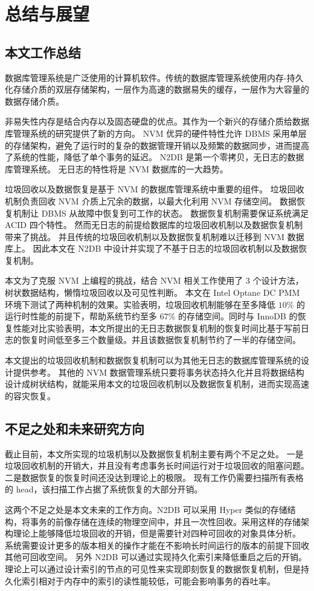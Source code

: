 
\chapter{总结与展望}

\section{本文工作总结}


数据库管理系统是广泛使用的计算机软件。传统的数据库管理系统使用内存-持久化存储介质的双层存储架构，一层作为高速的数据易失的缓存，一层作为大容量的数据存储介质。

非易失性内存是结合内存以及固态硬盘的优点。其作为一个新兴的存储介质给数据库管理系统的研究提供了新的方向。
NVM 优异的硬件特性允许 DBMS 采用单层的存储架构，避免了运行时的复杂的数据管理开销以及频繁的数据同步，进而提高了系统的性能，降低了单个事务的延迟。
N2DB 是第一个零拷贝，无日志的数据库管理系统。
无日志的特性将是 NVM 数据库的一大趋势。

垃圾回收以及数据恢复是基于 NVM 的数据库管理系统中重要的组件。
垃圾回收机制负责回收 NVM 介质上冗余的数据，以最大化利用 NVM 存储空间。
数据恢复机制让 DBMS 从故障中恢复到可工作的状态。
数据恢复机制需要保证系统满足 ACID 四个特性。
然而无日志的前提给数据库的垃圾回收机制以及数据恢复机制带来了挑战。
并且传统的垃圾回收机制以及数据恢复机制难以迁移到 NVM 数据库上。
因此本文在 N2DB 中设计并实现了不基于日志的垃圾回收机制以及数据恢复机制。

本文为了克服 NVM 上编程的挑战，结合 NVM 相关工作使用了 3 个设计方法，树状数据结构，懒惰垃圾回收以及可见性判断。
本文在 Intel Optane DC PMM 环境下测试了两种机制的效果。实验表明，垃圾回收机制能够在至多降低 $10\%$ 的运行时性能的前提下，帮助系统节约至多 $67\%$ 的存储空间。同时与 InnoDB 的恢复性能对比实验表明，本文所提出的无日志数据恢复机制的恢复时间比基于写前日志的恢复时间低至多三个数量级。并且该数据恢复机制节约了一半的存储空间。

本文提出的垃圾回收机制和数据恢复机制可以为其他无日志的数据库管理系统的设计提供参考。
其他的 NVM 数据管理系统只要将事务状态持久化并且将数据结构设计成树状结构，就能采用本文的垃圾回收机制以及数据恢复机制，进而实现高速的容灾恢复。


\section{不足之处和未来研究方向}

截止目前，本文所实现的垃圾机制以及数据恢复机制主要有两个不足之处。
一是垃圾回收机制的开销大，并且没有考虑事务长时间运行对于垃圾回收的阻塞问题。
二是数据恢复的恢复时间还没达到理论上的极限。
现有工作仍需要扫描所有表格的 head，该扫描工作占据了系统恢复的大部分开销。

这两个不足之处是本文未来的工作方向。N2DB 可以采用 Hyper 类似的存储结构，将事务的前像存储在连续的物理空间中，并且一次性回收。采用这样的存储架构理论上能够降低垃圾回收的开销，但是需要针对四种可回收的对象具体分析。
系统需要设计更多的版本相关的操作才能在不影响长时间运行的版本的前提下回收其他可回收空间。
另外 N2DB 可以通过实现持久化索引来降低重启之后的开销。理论上可以通过设计索引的节点的可见性来实现即刻恢复的数据恢复机制，但是持久化索引相对于内存中的索引的读性能较低，可能会影响事务的吞吐率。
